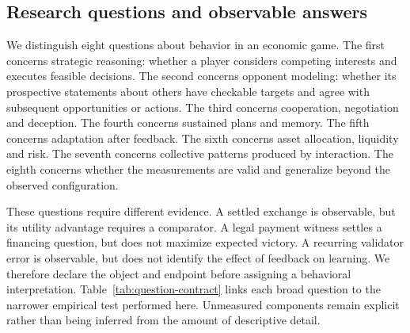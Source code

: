 \subsection{Research questions and observable answers}
\label{sec:research-questions}

We distinguish eight questions about behavior in an economic game. The first concerns strategic reasoning: whether a player considers competing interests and executes feasible decisions. The second concerns opponent modeling: whether its prospective statements about others have checkable targets and agree with subsequent opportunities or actions. The third concerns cooperation, negotiation and deception. The fourth concerns sustained plans and memory. The fifth concerns adaptation after feedback. The sixth concerns asset allocation, liquidity and risk. The seventh concerns collective patterns produced by interaction. The eighth concerns whether the measurements are valid and generalize beyond the observed configuration.

These questions require different evidence. A settled exchange is observable, but its utility advantage requires a comparator. A legal payment witness settles a financing question, but does not maximize expected victory. A recurring validator error is observable, but does not identify the effect of feedback on learning. We therefore declare the object and endpoint before assigning a behavioral interpretation. Table~\ref{tab:question-contract} links each broad question to the narrower empirical test performed here. Unmeasured components remain explicit rather than being inferred from the amount of descriptive detail.

